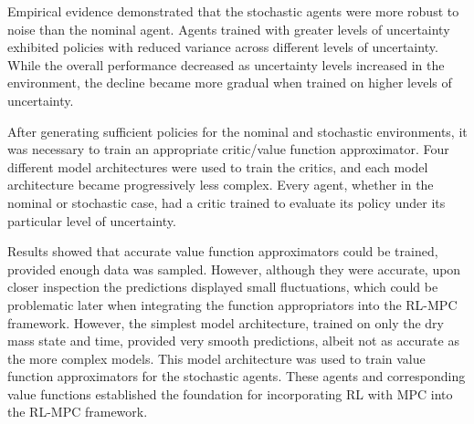 Empirical evidence demonstrated that the stochastic agents were more robust to noise than the nominal agent. Agents trained with greater levels of uncertainty exhibited policies with reduced variance across different levels of uncertainty. While the overall performance decreased as uncertainty levels increased in the environment, the decline became more gradual when trained on higher levels of uncertainty.

 After generating sufficient policies for the nominal and stochastic environments, it was necessary to train an appropriate critic/value function approximator. Four different model architectures were used to train the critics, and each model architecture became progressively less complex. Every agent, whether in the nominal or stochastic case, had a critic trained to evaluate its policy under its particular level of uncertainty. 
 
 Results showed that accurate value function approximators could be trained, provided enough data was sampled. However, although they were accurate, upon closer inspection the predictions displayed small fluctuations, which could be problematic later when integrating the function appropriators into the RL-MPC framework. However, the simplest model architecture, trained on only the dry mass state and time, provided very smooth predictions, albeit not as accurate as the more complex models. This model architecture was used to train value function approximators for the stochastic agents. These agents and corresponding value functions established the foundation for incorporating RL with MPC into the RL-MPC framework.

